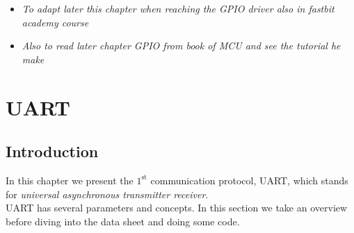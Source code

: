 \documentclass[12pt,a4paper]{book}
\begin{document}
\begin{itemize}

\item  \textit{To adapt later this chapter when reaching the GPIO driver also in fastbit academy course}

\item  \textit{Also to read later chapter GPIO from book of MCU and see the tutorial he make}
    
\end{itemize}



\chapter{UART}

\section{Introduction}

In this chapter we present the $\mathrm{1}^\mathrm{st}$ communication protocol, UART, which stands for \textit{universal asynchronous transmitter receiver}.\\


UART has several parameters and concepts. In this section we take an overview before diving into the data sheet and doing some code.
\end{document}
